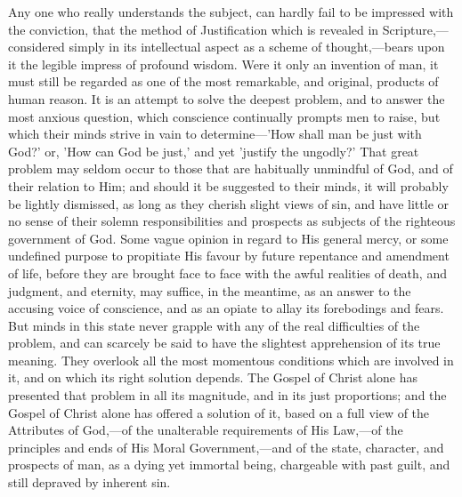 \documentclass[
]{book}
\begin{document}
Any one who really understands the subject, can hardly fail to be impressed with the conviction, that the method of Justification which is revealed in Scripture,---considered simply in its intellectual aspect as a scheme of thought,---bears upon it the legible impress of profound wisdom. Were it only an invention of man, it must still be regarded as one of the most remarkable, and original, products of human reason. It is an attempt to solve the deepest problem, and to answer the most anxious question, which conscience continually prompts men to raise, but which their minds strive in vain to determine---'How shall man be just with God?' or, 'How can God be just,' and yet 'justify the ungodly?' That great problem may seldom occur to those that are habitually unmindful of God, and of their relation to Him; and should it be suggested to their minds, it will probably be lightly dismissed, as long as they cherish slight views of sin, and have little or no sense of their solemn responsibilities and prospects as subjects of the righteous government of God. Some vague opinion in regard to His general mercy, or some undefined purpose to propitiate His favour by future repentance and amendment of life, before they are brought face to face with the awful realities of death, and judgment, and eternity, may suffice, in the meantime, as an answer to the accusing voice of conscience, and as an opiate to allay its forebodings and fears. But minds in this state never grapple with any of the real difficulties of the problem, and can scarcely be said to have the slightest apprehension of its true meaning. They overlook all the most momentous conditions which are involved in it, and on which its right solution depends. The Gospel of Christ alone has presented that problem in all its magnitude, and in its just proportions; and the Gospel of Christ alone has offered a solution of it, based on a full view of the Attributes of God,---of the unalterable requirements of His Law,---of the principles and ends of His Moral Government,---and of the state, character, and prospects of man, as a dying yet immortal being, chargeable with past guilt, and still depraved by inherent sin.
\end{document}
